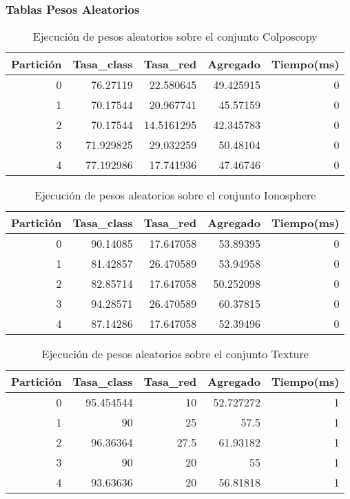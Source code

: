 \documentclass[size=a4, parskip=half, titlepage=false, toc=flat, toc=bib, 12pt]{scrartcl}
\begin{document}
\newpage

\subsubsection{Tablas Pesos Aleatorios}

 \begin{table}[ht]
  \centering
  \begin{tabular}[t]{rrrrr}
  \toprule
  Partición &Tasa\_class &Tasa\_red & Agregado & Tiempo(ms)\\
  \midrule
0         & 76.27119  & 22.580645  & 49.425915 & 0      \\
1         & 70.17544  & 20.967741  & 45.57159  & 0      \\
2         & 70.17544  & 14.5161295 & 42.345783 & 0      \\
3         & 71.929825 & 29.032259  & 50.48104  & 0      \\
4         & 77.192986 & 17.741936  & 47.46746  & 0      \\
  \bottomrule
  \end{tabular}
  \caption{Ejecución de pesos aleatorios sobre el conjunto Colposcopy }
  \end{table}%

 \begin{table}[ht]
  \centering
  \begin{tabular}[t]{rrrrr}
  \toprule
  Partición &Tasa\_class &Tasa\_red & Agregado & Tiempo(ms)\\
  \midrule
0         & 90.14085  & 17.647058 & 53.89395  & 0      \\
1         & 81.42857  & 26.470589 & 53.94958  & 0      \\
2         & 82.85714  & 17.647058 & 50.252098 & 0      \\
3         & 94.28571  & 26.470589 & 60.37815  & 0      \\
4         & 87.14286  & 17.647058 & 52.39496  & 0      \\
  \bottomrule
  \end{tabular}
  \caption{Ejecución de pesos aleatorios sobre el conjunto Ionosphere}
  \end{table}%

 \begin{table}[ht]
  \centering
  \begin{tabular}[t]{rrrrr}
  \toprule
  Partición &Tasa\_class &Tasa\_red & Agregado & Tiempo(ms)\\
  \midrule
0         & 95.454544 & 10       & 52.727272 & 1      \\
1         & 90        & 25       & 57.5      & 1      \\
2         & 96.36364  & 27.5     & 61.93182  & 1      \\
3         & 90        & 20       & 55        & 1      \\
4         & 93.63636  & 20       & 56.81818  & 1      \\
  \bottomrule
  \end{tabular}
  \caption{Ejecución de pesos aleatorios sobre el conjunto Texture}
  \end{table}%
\end{document}
